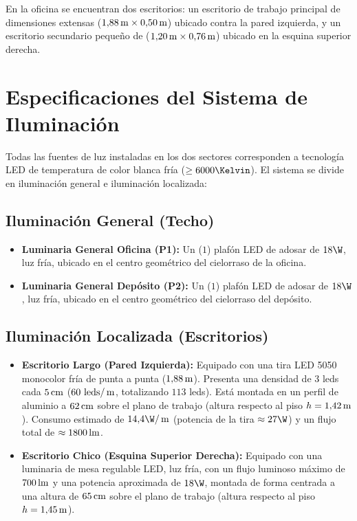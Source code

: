 En la oficina se encuentran dos escritorios: un escritorio de trabajo principal de dimensiones extensas ($1{,}88\,\mathrm{m} \times 0{,}50\,\mathrm{m}$) ubicado contra la pared izquierda, y un escritorio secundario pequeño de ($1{,}20\,\mathrm{m} \times 0{,}76\,\mathrm{m}$) ubicado en la esquina superior derecha.

\section{Especificaciones del Sistema de Iluminación}
\label{sec.tp2:especificaciones_luces}

Todas las fuentes de luz instaladas en los dos sectores corresponden a tecnología LED de temperatura de color blanca fría ($\ge 6000\Kelvin$). El sistema se divide en iluminación general e iluminación localizada:

\subsection{Iluminación General (Techo)}
\begin{itemize}
    \item \textbf{Luminaria General Oficina (P1):} Un ($1$) plafón LED de adosar de $18\W$, luz fría, ubicado en el centro geométrico del cielorraso de la oficina.
    \item \textbf{Luminaria General Depósito (P2):} Un ($1$) plafón LED de adosar de $18\W$, luz fría, ubicado en el centro geométrico del cielorraso del depósito.
\end{itemize}

\subsection{Iluminación Localizada (Escritorios)}
\begin{itemize}
    \item \textbf{Escritorio Largo (Pared Izquierda):} Equipado con una tira LED 5050 monocolor fría de punta a punta ($1{,}88\,\mathrm{m}$). Presenta una densidad de 3 leds cada $5\,\mathrm{cm}$ ($60\text{ leds}/\,\mathrm{m}$, totalizando $113$ leds). Está montada en un perfil de aluminio a $62\,\mathrm{cm}$ sobre el plano de trabajo (altura respecto al piso $h = 1{,}42\,\mathrm{m}$). Consumo estimado de $14{,}4\W/\m$ (potencia de la tira $\approx 27\W$) y un flujo total de $\approx 1800\,\mathrm{lm}$.
    \item \textbf{Escritorio Chico (Esquina Superior Derecha):} Equipado con una luminaria de mesa regulable LED, luz fría, con un flujo luminoso máximo de $700\,\mathrm{lm}$ y una potencia aproximada de $18\W$, montada de forma centrada a una altura de $65\,\mathrm{cm}$ sobre el plano de trabajo (altura respecto al piso $h = 1{,}45\,\mathrm{m}$).
\end{itemize}

